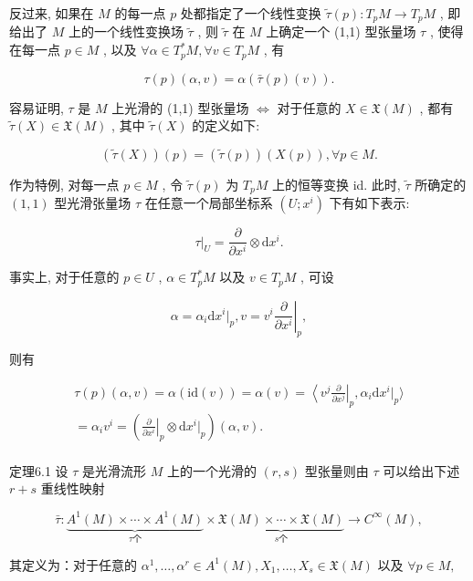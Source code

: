 反过来, 如果在  $M$  的每一点  $p$  处都指定了一个线性变换  $\tilde{\tau}(p): T_pM \to T_pM$ , 即给出了  $M$  上的一个线性变换场  $\tilde{\tau}$ , 则  $\tilde{\tau}$  在  $M$  上确定一个 (1,1) 型张量场  $\tau$ , 使得在每一点  $p \in M$ , 以及  $\forall \alpha \in T_p^*M, \forall v \in T_pM$ , 有

$$
\tau (p) (\alpha , v) = \alpha (\bar {\tau} (p) (v)).
$$

容易证明,  $\tau$  是  $M$  上光滑的 (1,1) 型张量场  $\Longleftrightarrow$  对于任意的  $X \in \mathfrak{X}(M)$ , 都有  $\tilde{\tau}(X) \in \mathfrak{X}(M)$ , 其中  $\tilde{\tau}(X)$  的定义如下:

$$
(\tilde {\tau} (X)) (p) = (\tilde {\tau} (p)) (X (p)), \forall p \in M.
$$

作为特例, 对每一点  $p \in M$ , 令  $\tilde{\tau}(p)$  为  $T_pM$  上的恒等变换 id. 此时,  $\tilde{\tau}$  所确定的  $(1,1)$  型光滑张量场  $\tau$  在任意一个局部坐标系  $(U; x^i)$  下有如下表示:

$$
\tau | _ {U} = \frac {\partial}{\partial x ^ {i}} \otimes \mathrm {d} x ^ {i}.
$$

事实上, 对于任意的  $p \in U$ ,  $\alpha \in T_p^* M$  以及  $v \in T_p M$ , 可设

$$
\alpha = \alpha_ {i} \mathrm {d} x ^ {i} | _ {p}, v = v ^ {i} \left. \frac {\partial}{\partial x ^ {i}} \right| _ {p},
$$

则有

$$
\begin{array}{l} \tau (p) (\alpha , v) = \alpha (\mathrm {i d} (v)) = \alpha (v) = \left\langle v ^ {j} \frac {\partial}{\partial x ^ {j}} \right| _ {p}, \alpha_ {i} \mathrm {d} x ^ {i} | _ {p} \Bigg \rangle \\ = \alpha_ {i} v ^ {i} = \left(\left. \frac {\partial}{\partial x ^ {i}} \right| _ {p} \otimes \mathrm {d} x ^ {i} | _ {p}\right) (\alpha , v). \\ \end{array}
$$

定理6.1 设  $\tau$  是光滑流形  $M$  上的一个光滑的  $(r, s)$  型张量则由  $\tau$  可以给出下述  $r + s$  重线性映射

$$
\bar {\tau}: \underbrace {A ^ {1} (M) \times \cdots \times A ^ {1} (M)} _ {\tau \text {个}} \times \underbrace {\mathfrak {X} (M) \times \cdots \times \mathfrak {X} (M)} _ {s \text {个}} \rightarrow C ^ {\infty} (M), %
$$

其定义为：对于任意的  $\alpha^1,\dots ,\alpha^r\in A^1 (M),X_1,\dots ,X_s\in \mathfrak{X}(M)$  以及 $\forall p\in M,$


